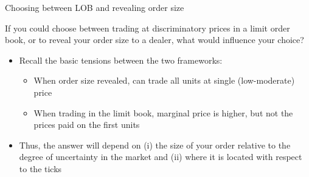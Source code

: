 \documentclass[english,10pt
,aspectratio=169
]{beamer}
\begin{document}
\begin{frame}{Choosing between LOB and revealing order size}
	\begin{exampleblock}{}
		If you could choose between trading at discriminatory prices in a limit order book, or to reveal your order size to a dealer, what would influence your choice?
	\end{exampleblock}
	\begin{itemize}
		\item Recall the basic tensions between the two frameworks: 
		\begin{itemize}
			\item When order size revealed, can trade all units at single (low-moderate) price
			\item When trading in the limit book, marginal price is higher, but not the prices paid on the first units
		\end{itemize}
		\item Thus, the answer will depend on (i) the size of your order relative to the degree of uncertainty in the market and (ii) where it is located with respect to the ticks
	\end{itemize}
\end{frame}
\end{document}
